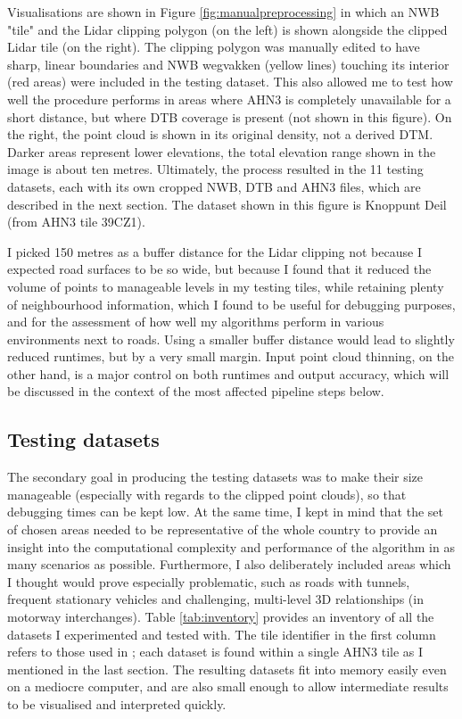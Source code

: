 Visualisations are shown in Figure \ref{fig:manualpreprocessing} in which an NWB "tile" and the Lidar clipping polygon (on the left) is shown alongside the clipped Lidar tile (on the right). The clipping polygon was manually edited to have sharp, linear boundaries and NWB wegvakken (yellow lines) touching its interior (red areas) were included in the testing dataset. This also allowed me to test how well the procedure performs in areas where AHN3 is completely unavailable for a short distance, but where DTB coverage is present (not shown in this figure). On the right, the point cloud is shown in its original density, not a derived DTM. Darker areas represent lower elevations, the total elevation range shown in the image is about ten metres. Ultimately, the process resulted in the 11 testing datasets, each with its own cropped NWB, DTB and AHN3 files, which are described in the next section. The dataset shown in this figure is Knoppunt Deil (from AHN3 tile 39CZ1).

I picked 150 metres as a buffer distance for the Lidar clipping not because I expected road surfaces to be so wide, but because I found that it reduced the volume of points to manageable levels in my testing tiles, while retaining plenty of neighbourhood information, which I found to be useful for debugging purposes, and for the assessment of how well my algorithms perform in various environments next to roads. Using a smaller buffer distance would lead to slightly reduced runtimes, but by a very small margin. Input point cloud thinning, on the other hand, is a major control on both runtimes and output accuracy, which will be discussed in the context of the most affected pipeline steps below.

\subsection{Testing datasets}
\label{sub:testingdata}

The secondary goal in producing the testing datasets was to make their size manageable (especially with regards to the clipped point clouds), so that debugging times can be kept low. At the same time, I kept in mind that the set of chosen areas needed to be representative of the whole country to provide an insight into the computational complexity and performance of the algorithm in as many scenarios as possible. Furthermore, I also deliberately included areas which I thought would prove especially problematic, such as roads with tunnels, frequent stationary vehicles and challenging, multi-level 3D relationships (in motorway interchanges). Table \ref{tab:inventory} provides an inventory of all the datasets I experimented and tested with. The tile identifier in the first column refers to those used in \cite{ahn3_download}; each dataset is found within a single AHN3 tile as I mentioned in the last section. The resulting datasets fit into memory easily even on a mediocre computer, and are also small enough to allow intermediate results to be visualised and interpreted quickly.

